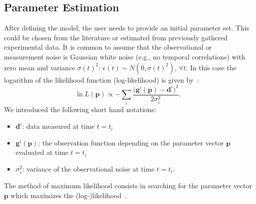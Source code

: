 \documentclass[10pt,A4paper]{article}
\newcommand{\mbp}{\mathbf{p}}
\newcommand{\mbd}{\mathbf{d}}
\begin{document}
\subsection*{Parameter Estimation}
After defining the model, the user needs to provide an initial parameter set.
This could be chosen from the literature or estimated from previously gathered experimental data.
It is common to assume that the observational or measurement noise is Gaussian white noise (e.g., no temporal correlations) with zero mean and variance $\sigma(t)^2$: $\epsilon(t) \sim N(0, \sigma(t)^2)$, $\forall t$.
In this case the logarithm of the likelihood function (log-likelihood) is given by~\cite{kreutzProfileLikelihood2013}:
\begin{equation}
    \ln L(\mbp) \propto - \sum_{i}\frac{ \big(\mathbf{g}^{i}(\mbp) - \mbd^{i}\big)^2}{2 \sigma_{i}^2}.
    \label{eq:likelihood_Gaussian}
\end{equation}
We introduced the following short hand notations:
\begin{itemize}
\item $\mbd^{i}$: data measured at time $t=t_i$
\item $\mathbf{g}^{i}(\mbp)$: the observation function depending on the parameter vector $\mbp$ evaluated at time $t=t_i$
\item $\sigma_{i}^2$: variance of the observational noise at time $t=t_i$.
\end{itemize}
The method of maximum likelihood consists in searching for the parameter vector $\mbp$ which maximizes the (log-)likelihood~\cite{gaborRobustEfficient2015}.
%
%
\end{document}
